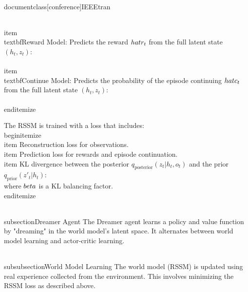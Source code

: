 \\documentclass[conference]{IEEEtran}
\begin{document}
    \\item \\textbf{Reward Model}: Predicts the reward \( \\hat{r}_t \) from the full latent state \( (h_t, z_t) \):
    \\[ \\hat{r}_t = p_{\theta}(r_t | h_t, z_t) \\]
    \\item \\textbf{Continue Model}: Predicts the probability of the episode continuing \( \\hat{c}_t \) from the full latent state \( (h_t, z_t) \):
    \\[ \\hat{c}_t = p_{\theta}(c_t | h_t, z_t) \\]
\\end{itemize}

The RSSM is trained with a loss that includes:
\\begin{itemize}
    \\item Reconstruction loss for observations.
    \\item Prediction loss for rewards and episode continuation.
    \\item KL divergence between the posterior \( q_{\text{posterior}}(z_t | h_t, o_t) \) and the prior \( q_{\text{prior}}(z'_t | h_t) \):
    \\[ \\mathcal{L}_{RSSM} = \\mathcal{L}_{obs\_recon} + \\mathcal{L}_{reward\_pred} + \\mathcal{L}_{continue\_pred} + \\beta D_{KL}(q_{\text{posterior}}(z_t | h_t, o_t) || q_{\text{prior}}(z'_t | h_t)) \\]
    where \( \\beta \) is a KL balancing factor.
\\end{itemize}

\\subsection{Dreamer Agent}
The Dreamer agent learns a policy and value function by "dreaming" in the world model's latent space. It alternates between world model learning and actor-critic learning.

\\subsubsection{World Model Learning}
The world model (RSSM) is updated using real experience collected from the environment. This involves minimizing the RSSM loss as described above.
\end{document}
